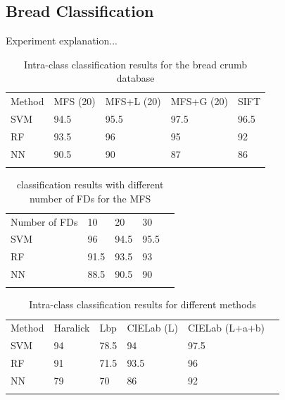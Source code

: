 \subsection{Bread Classification}
\label{sec:10}
Experiment explanation...

\begin{table}
\caption{Intra-class classification results for the bread crumb database}
\label{tab:1}       %
\begin{tabular}{lllll}
\hline\noalign{\smallskip}
Method & MFS (20) & MFS+L (20) & MFS+G (20) & SIFT  \\
\noalign{\smallskip}\hline\noalign{\smallskip}
SVM & 94.5 & 95.5 & 97.5 & 96.5 \\
RF  & 93.5 & 96 & 95 & 92 \\
NN & 90.5 & 90 & 87 & 86 \\
\noalign{\smallskip}\hline
\end{tabular}
\end{table}


\begin{table}
\caption{classification results with different number of FDs for the MFS}
\label{tab:2}       %
\begin{tabular}{lllll}
\hline\noalign{\smallskip}
Number of FDs & 10  & 20 & 30 \\
\noalign{\smallskip}\hline\noalign{\smallskip}
SVM & 96 & 94.5 & 95.5 \\
RF  & 91.5 & 93.5 & 93 \\
NN & 88.5 & 90.5 & 90 \\
\noalign{\smallskip}\hline
\end{tabular}
\end{table}

\begin{table}
\caption{Intra-class classification results for different methods}
\label{tab:1}       %
\begin{tabular}{llllll}
\hline\noalign{\smallskip}
Method & Haralick & Lbp & CIELab (L) & CIELab (L+a+b)\\ %
\noalign{\smallskip}\hline\noalign{\smallskip}
SVM & 94 & 78.5 & 94 & 97.5 \\ %
RF  & 91 & 71.5 & 93.5 & 96 \\ %
NN & 79 & 70 & 86 & 92 \\ %
\noalign{\smallskip}\hline
\end{tabular}
\end{table}

